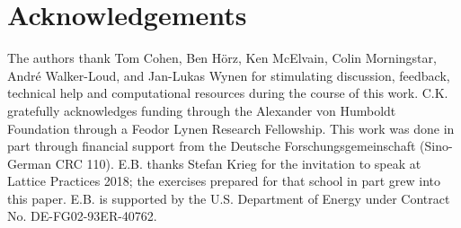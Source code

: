 \section*{Acknowledgements}\label{sec:acknowledgements}

The authors thank
Tom Cohen,
Ben H\"{o}rz,
Ken McElvain,
Colin Morningstar,
Andr\'{e} Walker-Loud,
and
Jan-Lukas Wynen
for stimulating discussion, feedback, technical help and computational resources during the course of this work.
C.K. gratefully acknowledges funding through the Alexander von Humboldt Foundation through a Feodor Lynen Research Fellowship.
This work was done in part through financial support from the Deutsche Forschungsgemeinschaft (Sino-German CRC 110).
E.B. thanks Stefan Krieg for the invitation to speak at Lattice Practices 2018\cite{lattice-practices}; the exercises\cite{lattice-practices-exercises} prepared for that school in part grew into this paper.
E.B. is supported by the U.S. Department of Energy under Contract No. DE-FG02-93ER-40762.
